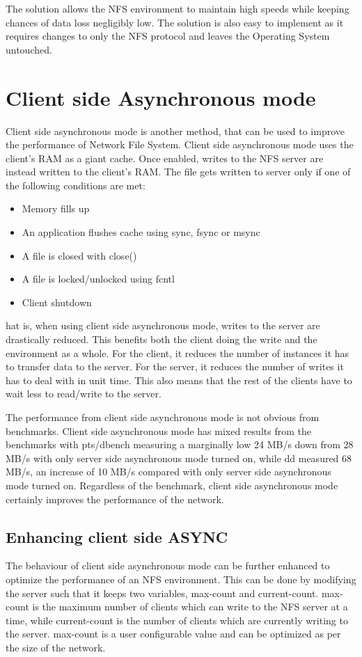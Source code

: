 \documentclass[conference]{IEEEtran}
\begin{document}
The solution allows the NFS environment to maintain high speeds while
keeping chances of data loss negligibly low. The solution is also easy to
implement as it requires changes to only the NFS protocol and leaves the
Operating System untouched.

\section{Client side Asynchronous mode}
Client side asynchronous mode is another method, that can be used to improve
the performance of Network File System. Client side asynchronous mode uses
the client's RAM as a giant cache. Once enabled, writes to the NFS server
are instead written to the client's RAM. The file gets written to server 
only if one of the following conditions are met:
\begin{itemize}
\item Memory fills up
\item An application flushes cache using sync, fsync or msync
\item A file is closed with close()
\item A file is locked/unlocked using fcntl
\item Client shutdown
\end{itemize}

hat is, when using client side asynchronous mode, writes to the server are
drastically reduced. This benefits both the client doing the write and the
environment as a whole. For the client, it reduces the number of instances
it has to transfer data to the server. For the server, it reduces the
number of writes it has to deal with in unit time. This also means that the
rest of the clients have to wait less to read/write to the server.

The performance from client side asynchronous mode is not obvious from
benchmarks. Client side asynchronous mode has mixed results from the 
benchmarks with pts/dbench measuring a marginally low 24 MB/s down from 
28 MB/s with only server side asynchronous mode turned on, while dd 
measured 68 MB/s, an increase of 10 MB/s compared with only server side
asynchronous mode turned on. Regardless of the benchmark, client side 
asynchronous mode certainly improves the performance of the network.

\subsection{Enhancing client side ASYNC }\label{SCM}
The behaviour of client side asynchronous mode can be further enhanced to 
optimize the performance of an NFS environment. This can be done by
modifying the server such that it keeps two variables, max-count and 
current-count. max-count is the maximum number of clients which can write 
to the NFS server at a time, while current-count is the number of clients 
which are currently writing to the server. max-count is a user configurable
value and can be optimized as per the size of the network.
\end{document}
